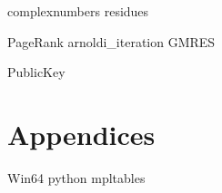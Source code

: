 \documentclass[nociteref]{SIAM-GH-book}
\begin{document}
{complexnumbers}
{residues}


{PageRank}
{arnoldi_iteration}
{GMRES}

{PublicKey}

\part{Appendices}
{Win64}
{python}
{mpltables}
\end{document}

